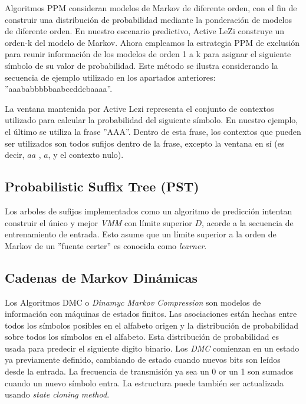 Algoritmos PPM consideran modelos de Markov de diferente orden,  con el fin de construir una distribución de probabilidad mediante la ponderación de modelos de diferente orden. En nuestro escenario predictivo, Active LeZi construye un orden-k del modelo de Markov. Ahora empleamos la estrategia PPM de exclusión para reunir información de los modelos de orden 1 a k para asignar el siguiente símbolo de su valor de probabilidad. Este método se ilustra considerando la secuencia de ejemplo utilizado en los apartados anteriores: ''aaababbbbbaabccddcbaaaa''.

La ventana mantenida por Active Lezi representa el conjunto de contextos utilizado para calcular la probabilidad  del siguiente símbolo. En nuestro ejemplo, el último se utiliza la frase ''AAA''. Dentro de esta frase, los contextos que pueden ser utilizados son todos sufijos dentro de la frase, excepto la ventana en sí (es decir, $aa$ , $a$, y el contexto nulo).

	


 \subsection{Probabilistic Suffix Tree (PST)}
 
 Los arboles de sufijos implementados como un algoritmo de predicción intentan construir el único y mejor \emph{VMM} con límite superior $D$, acorde a la secuencia de entrenamiento de entrada. Esto asume que un límite superior a la orden de Markov de un ''fuente certer'' es conocida como \emph{learner}.
 
 
 
 \subsection{Cadenas de Markov Dinámicas}
 
 
 Los Algoritmos DMC o \emph{Dinamyc Markov Compression} son modelos de información con máquinas de estados finitos. Las asociaciones están hechas entre todos los símbolos posibles en el alfabeto origen y la distribución de probabilidad sobre todos los símbolos en el alfabeto. 
 Esta distribución de probabilidad es usada para predecir el siguiente digito binario. 
 Los \emph{DMC} comienzan en un estado ya previamente definido, cambiando de estado cuando nuevos bits son leídos desde la entrada. La frecuencia de transmisión ya sea un 0 or un 1 son sumados cuando un nuevo símbolo entra. La estructura puede también ser actualizada usando \emph{state cloning method}.
 
